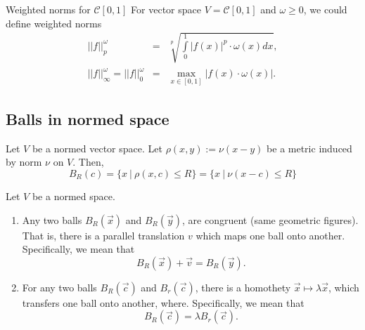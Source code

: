 \begin{definition}{Weighted norms for $ \mathcal{C}[0,1]$}{}
    For vector space $V = \mathcal{C}[0,1]$ and $\omega \geq 0$, we could define weighted norms
    \begin{eqnarray}
        \displaystyle ||f||_p^\omega &=& \sqrt[p]{\int\limits_0^1 |f(x)|^p \cdot \omega(x) dx}, \nonumber\\
        \displaystyle ||f||_\infty^\omega = ||f||_0^\omega &=& \max\limits_{x\in [0,1]} |f(x) \cdot \omega(x)|.\nonumber
    \end{eqnarray}
\end{definition}

\subsection*{Balls in normed space}
Let $V$ be a normed vector space. Let $\rho(x,y):=\nu(x-y)$ be a metric induced by norm $\nu$ on $V$. Then,
$$
    B_{R}(c)
    =
    \{x \ | \ \rho(x,c)\leq R \}
    =
    \{x \ | \ \nu(x-c)\leq R \}
$$
\begin{proposition}{}{}
    Let $V$ be a normed space.
    \begin{enumerate}
        \item Any two balls $B_R(\vec{x})$ and $B_R(\vec{y})$,  are congruent (same geometric figures). That is, there is a parallel translation $v$ which maps one ball onto another. Specifically, we mean that 
        $$B_R(\vec{x})+\vec{v}=B_R(\vec{y}).$$
        
        \item For any two balls $B_R(\vec{c})$ and $B_r(\vec{c})$, there is a homothety $\vec{x} \mapsto \lambda \vec{x}$, which transfers one ball onto another, where. Specifically, we mean that 
        $$B_R(\vec{c}) = \lambda B_r(\vec{c}).$$
    \end{enumerate}
\end{proposition}
